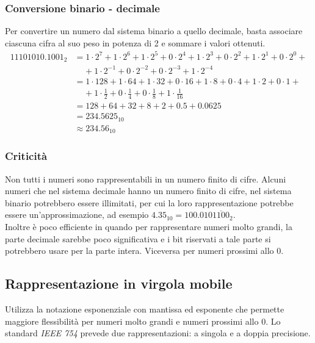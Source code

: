 \documentclass{article}
\begin{document}
\subsubsection*{Conversione binario - decimale}
Per convertire un numero dal sistema binario a quello decimale, basta associare ciascuna cifra al suo peso in potenza
di 2 e sommare i valori ottenuti.
\begin{align*}
	11101010.1001_2 &= 1 \cdot 2 ^ 7 + 1 \cdot 2 ^ 6 + 1 \cdot 2 ^ 5 + 0 \cdot 2 ^ 4 + 1 \cdot 2 ^ 3 + 0 \cdot 2 ^ 2 + 1 \cdot 2 ^ 1 + 0 \cdot 2 ^ 0 + \\
	&\;\;\;\; + 1 \cdot 2 ^{-1} + 0 \cdot 2 ^{-2} + 0 \cdot 2 ^{-3} + 1 \cdot 2 ^{-4} \\
	&=  1 \cdot 128 + 1 \cdot 64 + 1 \cdot 32 + 0 \cdot 16 + 1 \cdot 8 + 0 \cdot 4 + 1 \cdot 2 + 0 \cdot 1 + \\
	&\;\;\;\; + 1 \cdot \frac{1}{2} + 0 \cdot \frac{1}{4} + 0 \cdot \frac{1}{8} + 1 \cdot \frac{1}{16} \\
	&= 128 + 64 + 32 + 8 + 2 + 0.5 + 0.0625\\
	&= 234.5625_{10} \\
	&\approx 234.56_{10}
\end{align*}

\subsubsection*{Criticità}
Non tutti i numeri sono rappresentabili in un numero finito di cifre. Alcuni numeri che nel sistema decimale hanno un
numero finito di cifre, nel sistema binario potrebbero essere illimitati, per cui la loro rappresentazione potrebbe
essere un'approssimazione, ad esempio \(4.35_{10} = 100.010\overline{1100}_2\). \\
Inoltre è poco efficiente in quando per rappresentare numeri molto grandi, la parte decimale sarebbe poco significativa
e i bit riservati a tale parte si potrebbero usare per la parte intera. Viceversa per numeri prossimi allo 0.

\newpage


\subsection{Rappresentazione in virgola mobile}
Utilizza la notazione esponenziale con mantissa ed esponente che permette maggiore flessibilità per numeri molto grandi
e numeri prossimi allo 0. Lo standard \textit{IEEE 754} prevede due rappresentazioni: a singola e a doppia precisione.
\end{document}
